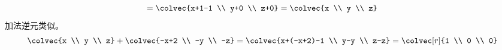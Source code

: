 \begin{answer}
\begin{exparts}
\begin{equation*}
             =\colvec{x+1-1 \\ y+0 \\ z+0}
             =\colvec{x \\ y \\ z}
           \end{equation*}
           加法逆元类似。
           \begin{equation*}
             \colvec{x \\ y \\ z}+\colvec{-x+2 \\ -y \\ -z}
             =\colvec{x+(-x+2)-1 \\ y-y \\ z-z}
             =\colvec[r]{1 \\ 0 \\ 0}
           \end{equation*}


\end{exparts}
\end{answer}
